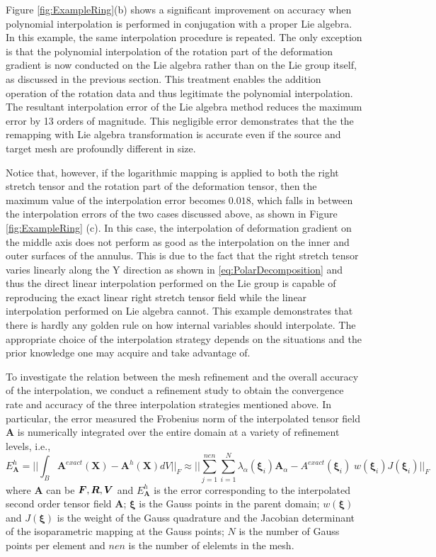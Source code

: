 \documentclass[12pt]{article}
\newcommand{\mbs}[1]{\boldsymbol{#1}}
\def\bA{{\mbs{A}}} \def\bB{{\mbs{B}}} \def\bC{{\mbs{C}}}
\def\bU{{\mbs{V}}} \def\bW{{\mbs{W}}} \def\bX{{\mbs{X}}}
\def\bxi{{\mbs{\xi}}}
\begin{document}
Figure \ref{fig:ExampleRing}(b) shows a significant improvement on
accuracy when polynomial interpolation is performed in conjugation
with a proper Lie algebra.  In this example, the same interpolation
procedure is repeated. The only exception is that the polynomial
interpolation of the rotation part of the deformation gradient is now
conducted on the Lie algebra rather than on the Lie group itself, as
discussed in the previous section.  This treatment enables the
addition operation of the rotation data and thus legitimate the
polynomial interpolation. The resultant interpolation error of the Lie
algebra method reduces the maximum error by 13 orders of
magnitude. This negligible error demonstrates that the the remapping
with Lie algebra transformation is accurate even if the source and
target mesh are profoundly different in size.

Notice that, however, if the logarithmic mapping is applied to both
the right stretch tensor and the rotation part of the deformation
tensor, then the maximum value of the interpolation error becomes
$0.018$, which falls in between the interpolation errors of the two
cases discussed above, as shown in Figure \ref{fig:ExampleRing}
(c). In this case, the interpolation of deformation gradient on the
middle axis does not perform as good as the interpolation on the inner
and outer surfaces of the annulus. This is due to the fact that the
right stretch tensor varies linearly along the Y direction as shown in
\ref{eq:PolarDecomposition} and thus the direct linear interpolation
performed on the Lie group is capable of reproducing the exact linear
right stretch tensor field while the linear interpolation performed on
Lie algebra cannot. This example demonstrates that there is hardly any
golden rule on how internal variables should interpolate. The
appropriate choice of the interpolation strategy depends on the
situations and the prior knowledge one may acquire and take advantage
of.

To investigate the relation between the mesh refinement and the
overall accuracy of the interpolation, we conduct a refinement study
to obtain the convergence rate and accuracy of the three interpolation
strategies mentioned above. In particular, the error measured the
Frobenius norm of the interpolated tensor field $\bA$ is numerically
integrated over the entire domain at a variety of refinement levels,
i.e.,
\begin{equation}
  E_{\bA}^{h} =  || \int_{B} \bA^{exact} (\bX)- \bA^{h}(\bX) dV ||_{F}   
  \approx || \sum^{nen}_{j=1}\sum^{N}_{i=1}
  \lambda_{\alpha} (\bxi_{i}) \bA_{\alpha} - A^{exact}(\bxi_{i})  \;
  w(\bxi_{i})  J(\bxi_{i}) ||_{F} 
\label{eq:FrobeniusNormOverall}
\end{equation}
where $\bA$ can be $\bF, \bR, \bU$ and $E_{\bA}^{h}$ is the error
corresponding to the interpolated second order tensor field $\bA$;
$\bxi$ is the Gauss points in the parent domain; $w(\bxi)$ and
$J(\bxi)$ is the weight of the Gauss quadrature and the Jacobian
determinant of the isoparametric mapping at the Gauss points; $N$ is
the number of Gauss points per element and $nen$ is the number of
elelemts in the mesh.
\end{document}

